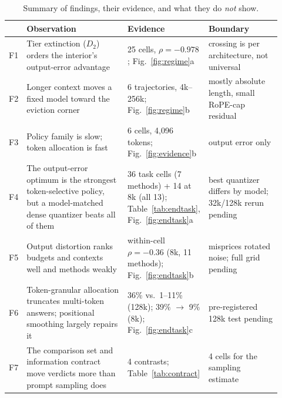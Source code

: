\documentclass{article}
\theoremstyle{definition}
\begin{document}
\begin{table}[t]
\centering
\small
\setlength{\tabcolsep}{4pt}
\caption{Summary of findings, their evidence, and what they do \emph{not} show.}
\label{tab:findings}
\begin{tabular}{@{}p{0.03\linewidth}p{0.40\linewidth}p{0.20\linewidth}p{0.29\linewidth}@{}}
\toprule
& \textbf{Observation} & \textbf{Evidence} & \textbf{Boundary} \\
\midrule
F1 & Tier extinction ($D_2$) orders the interior's output-error advantage & 25 cells, $\rho=-0.978$; Fig.~\ref{fig:regime}a & crossing is per architecture, not universal \\
F2 & Longer context moves a fixed model toward the eviction corner & 6 trajectories, 4k--256k; Fig.~\ref{fig:regime}b & mostly absolute length, small RoPE-cap residual \\
F3 & Policy family is slow; token allocation is fast & 6 cells, 4,096 tokens; Fig.~\ref{fig:evidence}b & output error only \\
F4 & The output-error optimum is the strongest token-selective policy, but a model-matched dense quantizer beats all of them & 36 task cells (7 methods) + 14 at 8k (all 13); Table~\ref{tab:endtask}, Fig.~\ref{fig:endtask}a & best quantizer differs by model; 32k/128k rerun pending \\
F5 & Output distortion ranks budgets and contexts well and methods weakly & within-cell $\rho=-0.36$ (8k, 11 methods); Fig.~\ref{fig:endtask}b & misprices rotated noise; full grid pending \\
F6 & Token-granular allocation truncates multi-token answers; positional smoothing largely repairs it & 36\% vs.\ 1--11\% (128k); 39\% $\to$ 9\% (8k); Fig.~\ref{fig:endtask}c & pre-registered 128k test pending \\
F7 & The comparison set and information contract move verdicts more than prompt sampling does & 4 contrasts; Table~\ref{tab:contract} & 4 cells for the sampling estimate \\
\bottomrule
\end{tabular}
\vspace{-2mm}
\end{table}
\end{document}

